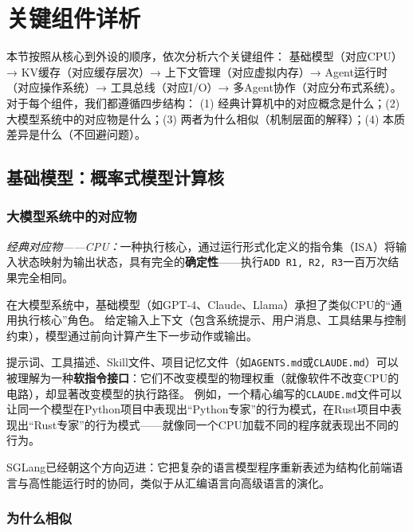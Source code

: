 \section{关键组件详析}
\label{sec:components}

本节按照从核心到外设的顺序，依次分析六个关键组件：
基础模型（对应CPU）→ KV缓存（对应缓存层次）→ 上下文管理（对应虚拟内存）→ Agent运行时（对应操作系统）→ 工具总线（对应I/O）→ 多Agent协作（对应分布式系统）。
对于每个组件，我们都遵循四步结构：
(1) 经典计算机中的对应概念是什么；(2) 大模型系统中的对应物是什么；(3) 两者为什么相似（机制层面的解释）；(4) 本质差异是什么（不回避问题）。

\subsection{基础模型：概率式模型计算核}
\label{sec:model}

\subsubsection{大模型系统中的对应物}

\textit{经典对应物——CPU：}一种执行核心，通过运行形式化定义的指令集（ISA）将输入状态映射为输出状态，具有完全的\textbf{确定性}——执行\texttt{ADD R1, R2, R3}一百万次结果完全相同\cite{riscv_spec_2026}。

在大模型系统中，基础模型（如GPT-4、Claude、Llama）承担了类似CPU的``通用执行核心''角色。
给定输入上下文（包含系统提示、用户消息、工具结果与控制约束），模型通过前向计算产生下一步动作或输出\cite{vaswani2017attention,brown2020gpt3,llama2023}。

提示词、工具描述、Skill文件、项目记忆文件（如\texttt{AGENTS.md}或\texttt{CLAUDE.md}）可以被理解为一种\textbf{软指令接口}：它们不改变模型的物理权重（就像软件不改变CPU的电路），却显著改变模型的执行路径\cite{openai_codex_agents_md_2026,openai_codex_skills_2026,anthropic_claudecode_memory_2026}。
例如，一个精心编写的\texttt{CLAUDE.md}文件可以让同一个模型在Python项目中表现出``Python专家''的行为模式，在Rust项目中表现出``Rust专家''的行为模式——就像同一个CPU加载不同的程序就表现出不同的行为。

SGLang已经朝这个方向迈进：它把复杂的语言模型程序重新表述为结构化前端语言与高性能运行时的协同，类似于从汇编语言向高级语言的演化\cite{sglang2024,sglang_docs_2026}。

\subsubsection{为什么相似}

